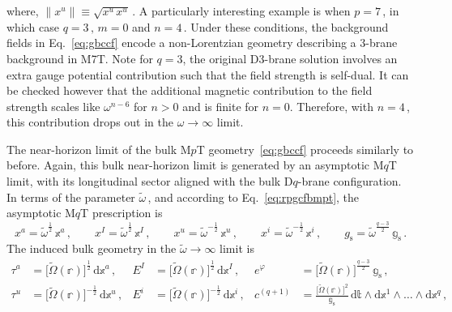\documentclass[11pt]{article}
\newcommand{\be}{\begin{equation}}
\newcommand{\ee}{\end{equation}}
\renewcommand{\tilde}[1]{\widetilde{#1}}
\newcommand{\dd}{\mathrm{d}}
\begin{document}
%
where, $\| x^u \| \equiv \sqrt{x^u \, x^u}$\,. 
A particularly interesting example is when $p = 7$\,, in which case $q = 3\,, \, m = 0$ and $n = 4$\,. Under these conditions, the background fields in Eq.~\eqref{eq:gbccf} encode a non-Lorentzian geometry describing a 3-brane background in M7T.  
Note for $q=3$, the original D3-brane solution involves an extra gauge potential contribution such that the field strength is self-dual.
It can be checked however that the additional magnetic contribution to the field strength scales like $\omega^{n-6}$ for $n>0$ and is finite for $n=0$.
Therefore, with $n=4$\,, this contribution drops out in the $\omega \rightarrow \infty$ limit.

The near-horizon limit of the bulk M$p$T geometry~\eqref{eq:gbccf} proceeds similarly to before. Again, this bulk near-horizon limit is generated by an asymptotic M$q$T limit, with its longitudinal sector aligned with the bulk D$q$-brane configuration. In terms of the parameter $\tilde{\omega}$\,, and according to Eq.~\eqref{eq:rpgcfbmpt}, the asymptotic M$q$T prescription is
%
\be \label{eq:xaxixuxi}
    x^a = \tilde{\omega}^{\frac{1}{2}} \, \mathbb{x}^a\,, 
        \qquad%
    x^I = \tilde{\omega}^{\frac{1}{2}} \, \mathbb{x}^I\,, 
        \qquad%
    x^u = \tilde{\omega}^{-\frac{1}{2}} \, \mathbb{x}^u\,, 
        \qquad%
    x^i = \tilde{\omega}^{-\frac{1}{2}} \, \mathbb{x}^i\,, 
        \qquad%
    g^{}_\text{s} = \tilde{\omega}^{\frac{q-3}{2}} \, \mathbb{g}^{}_\text{s}\,.
\ee
%
The induced bulk geometry in the $\tilde{\omega} \rightarrow \infty$ limit is
%
\begin{subequations} \label{eq:mptsl02}
\begin{align} 
    \tau^{a} & = \bigl[ \tilde{\mathbb{\Omega}} (\mathbb{r}) \bigr]^\frac{1}{2} \, \dd \mathbb{x}^a\,,
        &%
    E^{I} & = \bigl[ \tilde{\mathbb{\Omega}} (\mathbb{r}) \bigr]^{\frac{1}{2}} \, \dd \mathbb{x}^{I}\,, 
        &%
    e^{\varphi} & = \bigl[ \tilde{\mathbb{\Omega}} (\mathbb{r}) \bigr]^{\!\frac{q-3}{2}} \, \mathbb{g}_\text{s} \,, \\[4pt]
    \tau^u & = \bigl[ \tilde{\mathbb{\Omega}} (\mathbb{r}) \bigr]^{-\frac{1}{2}} \, \dd \mathbb{x}^{u}\,,
        &%
    E^{i} & = \bigl[ \tilde{\mathbb{\Omega}} (\mathbb{r}) \bigr]^{-\frac{1}{2}} \, \dd \mathbb{x}^{i} \,,
        &%
    c^{(q+1)} & = \frac{\bigl[ \tilde{\mathbb{\Omega}}(\mathbb{r}) \bigr]^2}{\mathbb{g}_\text{s}} \, \dd \mathbb{t} \wedge \dd \mathbb{x}^1 \wedge \dots \wedge \dd \mathbb{x}^{q} \,,
\end{align}
\end{subequations}
\end{document}
